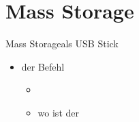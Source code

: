 \section{Mass Storage}
\begin{frame}{Mass Storage}{\beaglebone als USB Stick} 
 \begin{itemize}
  \item der Befehl 
  \begin{itemize}
   \item {}
   \item wo ist der 
  \end{itemize}
 \end{itemize}
\end{frame}
